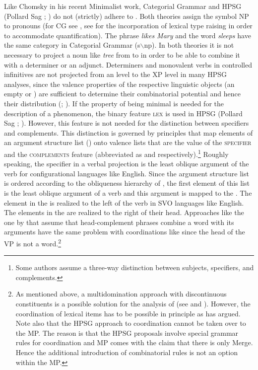 \enlargethispage{8pt}
Like Chomsky in his recent Minimalist work, Categorial Grammar \citep{Ajdukiewicz35a-u} and HPSG
(Pollard \biband Sag \citeyear{ps}; \citeyear[--40]{ps2}) do not (strictly) adhere to
\xbart. Both theories assign the symbol NP to pronouns (for CG see , see
 for the incorporation of lexical type raising in order to accommodate
quantification). The phrase \emph{likes Mary} and the word \emph{sleeps} have the same category in Categorial Grammar (s$\backslash$np). In both theories it is not
necessary to project a noun like \emph{tree} from \nnull to \nbar in order to be able to combine it
with a determiner or an adjunct. Determiners and monovalent verbs in controlled infinitives are
not projected from an \xzero level to the XP level in many HPSG analyses, since the valence
properties of the respective linguistic objects (an empty \subcat or \compsl) are sufficient to
determine their combinatorial potential and hence their distribution (\citealp{Mueller96a};
\citealp{Mueller99a}). If the property of being minimal is needed for the description of a 
phenomenon, the binary feature \textsc{lex} is used in HPSG (Pollard \biband Sag \citeyear[]{ps};
\citeyear[]{ps2}). However, this feature is not needed for the distinction between
specifiers and complements. This distinction is governed by principles that map elements of an
argument structure list (\argst) onto valence lists that are the value of the \textsc{specifier} and
the \textsc{complements} feature (abbreviated as \spr and \comps respectively).\footnote{%
  Some authors assume a three-way distinction between subjects, specifiers, and complements.
} Roughly speaking, the specifier in a verbal projection is the least oblique argument of the verb for
configurational languages like English. Since the argument structure list is ordered according to
the obliqueness hierarchy of \citet{KC77a}, the first element of this list is the least oblique
argument of a verb and this argument is mapped to the \sprl. The element in the \sprl is realized to the left of the
verb in SVO languages like English. The elements in the \compsl are realized to the right of their
head. Approaches like the one by \citet[, 364]{GSag2000a-u} that assume that
head-complement phrases combine a word with its arguments have the same problem with coordinations
like  since the head of the VP is not a word.\footnote{%
  As mentioned above, a multidomination approach with discontinuous constituents is a possible
  solution for the analysis of   (see
  \citealp{Crysmann2000a} and \citealp{BS2004a}). However, the coordination of lexical items has to be possible in
  principle as \citet{Abeille2006a} has argued. Note also that the HPSG approach to coordination
  cannot be taken over to the MP. The reason is that the HPSG proposals involve special grammar
  rules for coordination and MP comes with the claim that there is only Merge. Hence the additional
  introduction of combinatorial rules is not an option within the MP.
} 
